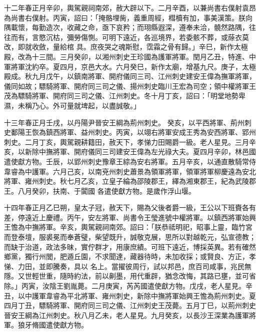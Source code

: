 \begin{pinyinscope}
 十二年春正月辛卯，輿駕親祠南郊，赦大辟以下。二月辛酉，以兼尚書右僕射袁昂為尚書右僕射。丙寅，詔曰：「掩骼埋胔，義重周經，槥櫝有加，事美漢策。朕向隅載懷，每勤造次，收藏之命，亟下哀矜；而珝縣遐深，遵奉未洽，髐然路隅，往往而有，言愍沉枯，彌勞傷惻。可明下遠近，各巡境界，若委骸不葬，或蒢衣莫改，即就收斂，量給棺
 具。庶夜哭之魂斯慰，霑霜之骨有歸。」辛巳，新作太極殿，改為十三間。三月癸卯，以湘州刺史王珍國為護軍將軍。閏月乙丑，特進、中軍將軍沈約卒。夏四月，京邑大水。六月癸巳，新作太廟，增基九尺。庚子，太極殿成。秋九月戊午，以鎮南將軍、開府儀同三司、江州刺史建安王偉為撫軍將軍，儀同如故；驃騎將軍、開府同三司之儀、揚州刺史臨川王宏為司空；領中權將軍王茂為驃騎將軍、開府同三司之儀、江州刺史。冬十月丁亥，詔曰：「明堂地勢卑濕，未稱乃心。外可量就埤起，以盡誠敬。」



 十三年春正月壬戌，以丹陽尹晉安王綱為荊州刺史。
 癸亥，以平西將軍、荊州刺史鄱陽王恢為鎮西將軍、益州刺史。丙寅，以翊右將軍安成王秀為安西將軍、郢州刺史。二月丁亥，輿駕親耕籍田，赦天下，孝悌力田賜爵一級。老人星見。三月辛亥，以新除中撫將軍、開府儀同三司建安王偉為左光祿大夫。夏四月辛卯，林邑國遣使獻方物。壬辰，以郢州刺史豫章王綜為安右將軍。五月辛亥，以通直散騎常侍韋睿為中護軍。六月己亥，以南兗州刺史蕭景為領軍將軍，領軍將軍柳慶遠為安北將軍、雍州刺史。秋七月乙亥，立皇子綸為邵陵郡王，繹為湘東郡王，紀為武陵郡王。八月癸卯，扶南、于闐國
 各遣使獻方物。是歲作浮山堰。



 十四年春正月乙巳朔，皇太子冠，赦天下，賜為父後者爵一級，王公以下班賚各有差，停遠近上慶禮。丙午，安左將軍、尚書令王瑩進號中權將軍。以鎮西將軍始興王憺為中撫將軍。辛亥，輿駕親祠南郊。詔曰：「朕恭祗明祀，昭事上靈，臨竹宮而登泰壇，服裘冕而奉蒼璧，柴望既升，誠敬克展，思所以對越乾元，弘宣德教；而缺于治道，政法多昧，實佇群才，用康庶績。可班下遠近，博採英異。若有確然鄉黨，獨行州閭，肥遁丘園，不求聞達，藏器待時，未加收採；或賢良、方正，孝悌、力田，並即騰奏，具以
 名上。當擢彼周行，試以邦邑，庶百司咸事，兆民無隱。又世輕世重，隨時約法，前以劓墨，用代重辟，猶念改悔，其路已壅，並可省除。」丙寅，汝陰王劉胤薨。二月庚寅，芮芮國遣使獻方物。戊戌，老人星見。辛丑，以中護軍韋睿為平北將軍、雍州刺史，新除中撫將軍始興王憺為荊州刺史。夏四月丁丑，驃騎將軍、開府同三司之儀、江州刺史王茂薨。五月丁巳，以荊州刺史晉安王綱為江州刺史。秋八月乙未，老人星見。九月癸亥，以長沙王深業為護軍將軍。狼牙脩國遣使獻方物。




\end{pinyinscope}
